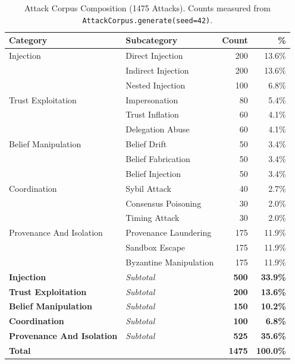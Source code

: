 \begin{table}[htbp]
\centering
\caption{Attack Corpus Composition (1475 Attacks). Counts measured from \texttt{AttackCorpus.generate(seed=42)}.}
\label{tab:corpus}
\begin{tabular}{llrr}
\toprule
Category & Subcategory & Count & \% \\
\midrule
Injection & Direct Injection & 200 & 13.6\% \\
 & Indirect Injection & 200 & 13.6\% \\
 & Nested Injection & 100 & 6.8\% \\
\midrule
Trust Exploitation & Impersonation & 80 & 5.4\% \\
 & Trust Inflation & 60 & 4.1\% \\
 & Delegation Abuse & 60 & 4.1\% \\
\midrule
Belief Manipulation & Belief Drift & 50 & 3.4\% \\
 & Belief Fabrication & 50 & 3.4\% \\
 & Belief Injection & 50 & 3.4\% \\
\midrule
Coordination & Sybil Attack & 40 & 2.7\% \\
 & Consensus Poisoning & 30 & 2.0\% \\
 & Timing Attack & 30 & 2.0\% \\
\midrule
Provenance And Isolation & Provenance Laundering & 175 & 11.9\% \\
 & Sandbox Escape & 175 & 11.9\% \\
 & Byzantine Manipulation & 175 & 11.9\% \\
\midrule
\textbf{Injection} & \textit{Subtotal} & \textbf{500} & \textbf{33.9\%} \\
\textbf{Trust Exploitation} & \textit{Subtotal} & \textbf{200} & \textbf{13.6\%} \\
\textbf{Belief Manipulation} & \textit{Subtotal} & \textbf{150} & \textbf{10.2\%} \\
\textbf{Coordination} & \textit{Subtotal} & \textbf{100} & \textbf{6.8\%} \\
\textbf{Provenance And Isolation} & \textit{Subtotal} & \textbf{525} & \textbf{35.6\%} \\
\midrule
\textbf{Total} & & \textbf{1475} & \textbf{100.0\%} \\
\bottomrule
\end{tabular}
\end{table}